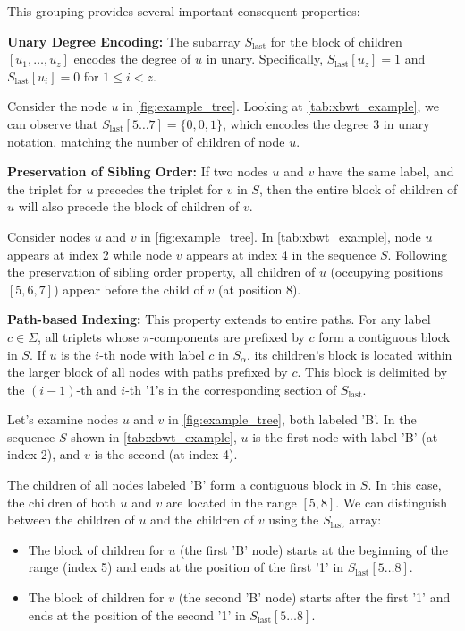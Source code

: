 This grouping provides several important consequent properties:

\textbf{Unary Degree Encoding:} The subarray $S_{\text{last}}$ for the block of children $[u_1, \dots, u_z]$ encodes the degree of $u$ in unary. Specifically, $S_{\text{last}}[u_z] = 1$ and $S_{\text{last}}[u_i] = 0$ for $1 \leq i < z$. 
\begin{example}
    Consider the node $u$ in \cref{fig:example_tree}. Looking at \cref{tab:xbwt_example}, we can observe that $S_{\text{last}}[5 \dots 7] = \{0, 0, 1\}$, which encodes the degree 3 in unary notation, matching the number of children of node $u$.
\end{example}

\textbf{Preservation of Sibling Order:} If two nodes $u$ and $v$ have the same label, and the triplet for $u$ precedes the triplet for $v$ in $S$, then the entire block of children of $u$ will also precede the block of children of $v$.
\begin{example}
    Consider nodes $u$ and $v$ in \cref{fig:example_tree}. In \cref{tab:xbwt_example}, node $u$ appears at index 2 while node $v$ appears at index 4 in the sequence $S$. Following the preservation of sibling order property, all children of $u$ (occupying positions $[5, 6, 7]$) appear before the child of $v$ (at position $8$).
\end{example}

\textbf{Path-based Indexing:} This property extends to entire paths. For any label $c \in \Sigma$, all triplets whose $\pi$-components are prefixed by $c$ form a contiguous block in $S$. If $u$ is the $i$-th node with label $c$ in $S_{\alpha}$, its children's block is located within the larger block of all nodes with paths prefixed by $c$. This block is delimited by the $(i-1)$-th and $i$-th '1's in the corresponding section of $S_{\text{last}}$. \label{prop3}
\begin{example}
    Let's examine nodes $u$ and $v$ in \cref{fig:example_tree}, both labeled 'B'. In the sequence $S$ shown in \cref{tab:xbwt_example}, $u$ is the first node with label 'B' (at index 2), and $v$ is the second (at index 4).

    The children of all nodes labeled 'B' form a contiguous block in $S$. In this case, the children of both $u$ and $v$ are located in the range $[5, 8]$. We can distinguish between the children of $u$ and the children of $v$ using the $S_{\text{last}}$ array:
    \begin{itemize}
        \item The block of children for $u$ (the first 'B' node) starts at the beginning of the range (index 5) and ends at the position of the first '1' in $S_{\text{last}}[5\dots8]$.
        \item The block of children for $v$ (the second 'B' node) starts after the first '1' and ends at the position of the second '1' in $S_{\text{last}}[5\dots8]$.
    \end{itemize}
\end{example}

